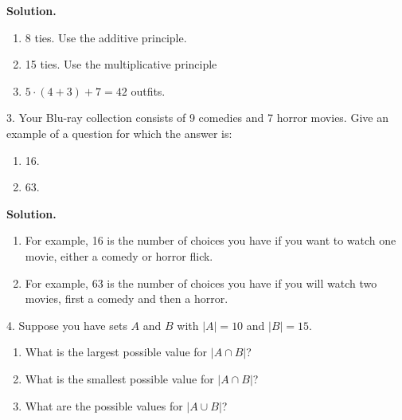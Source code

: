 \documentclass[10pt,]{book}
\theoremstyle{plain}
\theoremstyle{definition}
\theoremstyle{definition}
\theoremstyle{definition}
\numberwithin{equation}{section}
\newcommand{\card}[1]{\left| #1 \right|}
\begin{document}
\begin{exerciselist}
\par\smallskip
\par\smallskip
\noindent\textbf{Solution.}\hypertarget{solution-69}{}\quad
\leavevmode%
\begin{enumerate}[label=(\alph*)]
\item\hypertarget{li-384}{}
              8 ties.  Use the additive principle.
\item\hypertarget{li-385}{}15 ties. Use the multiplicative principle%
\item\hypertarget{li-386}{}\(5\cdot (4+3) + 7 = 42\) outfits.%
\end{enumerate}
\item[3.]\hypertarget{exercise-44}{}
          Your Blu-ray collection consists of 9 comedies and 7 horror movies. Give an example of a question for which the answer is:
\leavevmode%
\begin{enumerate}[label=(\alph*)]
\item\hypertarget{li-387}{}
              16.
\item\hypertarget{li-388}{}
              63.
\end{enumerate}
\par\smallskip
\par\smallskip
\noindent\textbf{Solution.}\hypertarget{solution-70}{}\quad
\leavevmode%
\begin{enumerate}[label=(\alph*)]
\item\hypertarget{li-389}{}
              For example, 16 is the number of choices you have if you want to watch one movie, either a comedy or horror flick.
\item\hypertarget{li-390}{}
              For example, 63 is the number of choices you have if you will watch two movies, first a comedy and then a horror.
\end{enumerate}
\item[4.]\hypertarget{exercise-45}{}
          Suppose you have sets \(A\) and \(B\) with \(\card{A} = 10\) and \(\card{B} = 15\).
          \leavevmode%
\begin{enumerate}[label=(\alph*)]
\item\hypertarget{li-391}{}What is the largest possible value for \(\card{A \cap B}\)?%
\item\hypertarget{li-392}{} What is the smallest possible value for \(\card{A \cap B}\)?%
\item\hypertarget{li-393}{} What are the possible values for \(\card{A \cup B}\)?%
\end{enumerate}


\end{exerciselist}
\end{document}
